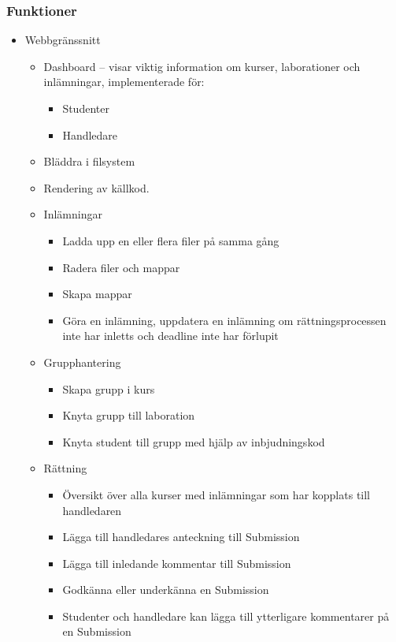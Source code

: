 \subsubsection{Funktioner}
\begin{itemize}
	\item Webbgränssnitt
	\begin{itemize}
		\item Dashboard – visar viktig information om kurser, laborationer och inlämningar, implementerade för:
		\begin{itemize}
			\item Studenter
			\item Handledare
		\end{itemize}
		\item Bläddra i filsystem
		\item Rendering av källkod.
		\item Inlämningar
		\begin{itemize}
			\item Ladda upp en eller flera filer på samma gång
			\item Radera filer och mappar
			\item Skapa mappar
			\item Göra en inlämning, uppdatera en inlämning om rättningsprocessen inte har inletts och deadline inte har förlupit
		\end{itemize}
		\item Grupphantering
		\begin{itemize}
			\item Skapa grupp i kurs
            \item Knyta grupp till laboration
            \item Knyta student till grupp med hjälp av inbjudningskod
		\end{itemize}
		\item Rättning
		\begin{itemize}
			\item Översikt över alla kurser med inlämningar som har kopplats till handledaren
            \item Lägga till handledares anteckning till Submission
            \item Lägga till inledande kommentar till Submission
            \item Godkänna eller underkänna en Submission
            \item Studenter och handledare kan lägga till ytterligare kommentarer på en Submission
		\end{itemize}
	\end{itemize}
\end{itemize}

